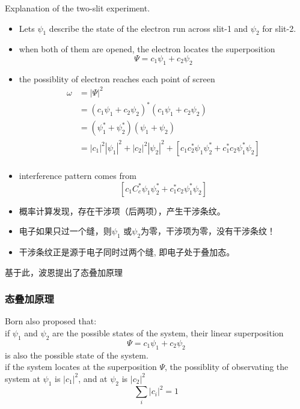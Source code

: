 \begin{frame} [allowframebreaks=]
    Explanation of the two-slit experiment.\\
    \begin{itemize}
        \item Lets $\psi_1$ describe the state of the electron run across slit-1 and $\psi_2$ for slit-2. \\
        \item when both of them are opened, the electron locates the superposition 
            \[ \Psi=c_1 \psi_1+ c_2\psi_2 \]
        \item the possiblity of electron reaches each point of screen 
    \begin{equation*}
        \begin{split}
            \omega &=|\Psi|^2 \\
            &= (c_1 \psi_1+ c_2\psi_2)^* (c_1 \psi_1+ c_2\psi_2) \\
            &=(\psi_1^*+\psi_2^*)(\psi_1+\psi_2) \\ 
            & = |c_1|^2 |\psi_1|^2 + |c_2|^2 |\psi_2|^2  + [c_1 c_2 ^* \psi_1 \psi_2 ^* + c_1 ^* c_2 \psi_1 ^* \psi_2] \\
        \end{split} 
    \end{equation*}
        \item interference pattern comes from  
     \[[c_1 C_c ^* \psi_1 \psi_2 ^* + c_1 ^* c_2 \psi_1 ^* \psi_2] \]
    \end{itemize}
    \begin{itemize}
        \item 概率计算发现，存在干涉项（后两项），产生干涉条纹。
        \item 电子如果只过一个缝，则$\psi_1$ 或$\psi_2$为零，干涉项为零，没有干涉条纹！
        \item 干涉条纹正是源于电子同时过两个缝, 即电子处于叠加态。
    \end{itemize}
    基于此，波恩提出了态叠加原理
\end{frame}

\begin{frame}
    \frametitle{态叠加原理}
    \begin{tcolorbox}[colback=yellow!10,colframe=red!75!black,title=Superposition principle of states]
    Born also proposed that: \\
    if $\psi_1$ and $\psi_2$ are the possible states of the system,
    their linear superposition \[ \Psi=c_1 \psi_1+ c_2\psi_2 \]
    is also the possible state of the system.\\
    if the system locates at the superposition $\Psi$, the possiblity of observating the system at $\psi_1$ is $|c_1|^2$, and at $\psi_2$ is $|c_2|^2$ \\
    \[\sum_i |c_i|^2 =1\]
    \end{tcolorbox}
\end{frame}

